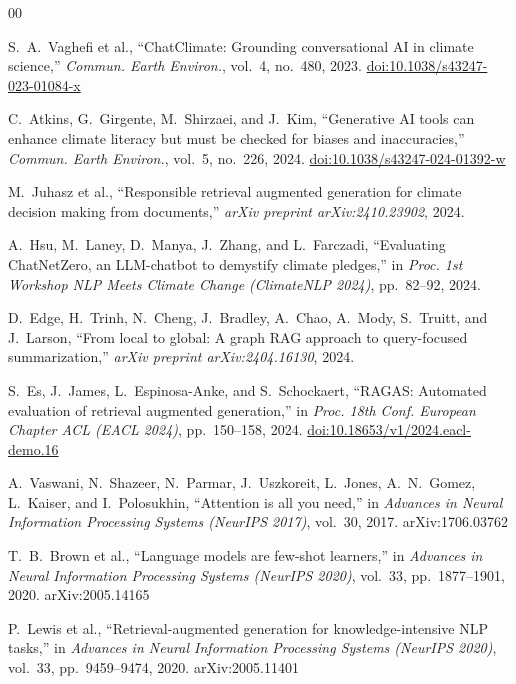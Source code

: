 \documentclass[conference]{IEEEtran}
\begin{document}
\begin{thebibliography}{00}

S.~A.~Vaghefi et al.,
``ChatClimate: Grounding conversational AI in climate science,''
\textit{Commun. Earth Environ.}, vol.~4, no.~480, 2023.
\href{https://doi.org/10.1038/s43247-023-01084-x}{doi:10.1038/s43247-023-01084-x}

C.~Atkins, G.~Girgente, M.~Shirzaei, and J.~Kim,
``Generative AI tools can enhance climate literacy but must be
checked for biases and inaccuracies,''
\textit{Commun. Earth Environ.}, vol.~5, no.~226, 2024.
\href{https://doi.org/10.1038/s43247-024-01392-w}{doi:10.1038/s43247-024-01392-w}

M.~Juhasz et al.,
``Responsible retrieval augmented generation for climate
decision making from documents,''
\textit{arXiv preprint arXiv:2410.23902}, 2024.

A.~Hsu, M.~Laney, D.~Manya, J.~Zhang, and L.~Farczadi,
``Evaluating ChatNetZero, an LLM-chatbot to demystify
climate pledges,''
in \textit{Proc. 1st Workshop NLP Meets Climate Change
(ClimateNLP 2024)}, pp.~82--92, 2024.

D.~Edge, H.~Trinh, N.~Cheng, J.~Bradley, A.~Chao, A.~Mody,
S.~Truitt, and J.~Larson,
``From local to global: A graph RAG approach to
query-focused summarization,''
\textit{arXiv preprint arXiv:2404.16130}, 2024.

S.~Es, J.~James, L.~Espinosa-Anke, and S.~Schockaert,
``RAGAS: Automated evaluation of retrieval augmented
generation,''
in \textit{Proc. 18th Conf. European Chapter ACL (EACL 2024)},
pp.~150--158, 2024.
\href{https://doi.org/10.18653/v1/2024.eacl-demo.16}{doi:10.18653/v1/2024.eacl-demo.16}

A.~Vaswani, N.~Shazeer, N.~Parmar, J.~Uszkoreit, L.~Jones,
A.~N.~Gomez, L.~Kaiser, and I.~Polosukhin,
``Attention is all you need,''
in \textit{Advances in Neural Information Processing Systems
(NeurIPS 2017)}, vol.~30, 2017.
arXiv:1706.03762

T.~B.~Brown et al.,
``Language models are few-shot learners,''
in \textit{Advances in Neural Information Processing Systems
(NeurIPS 2020)}, vol.~33, pp.~1877--1901, 2020.
arXiv:2005.14165

P.~Lewis et al.,
``Retrieval-augmented generation for knowledge-intensive NLP tasks,''
in \textit{Advances in Neural Information Processing Systems
(NeurIPS 2020)}, vol.~33, pp.~9459--9474, 2020.
arXiv:2005.11401


\end{thebibliography}
\end{document}
